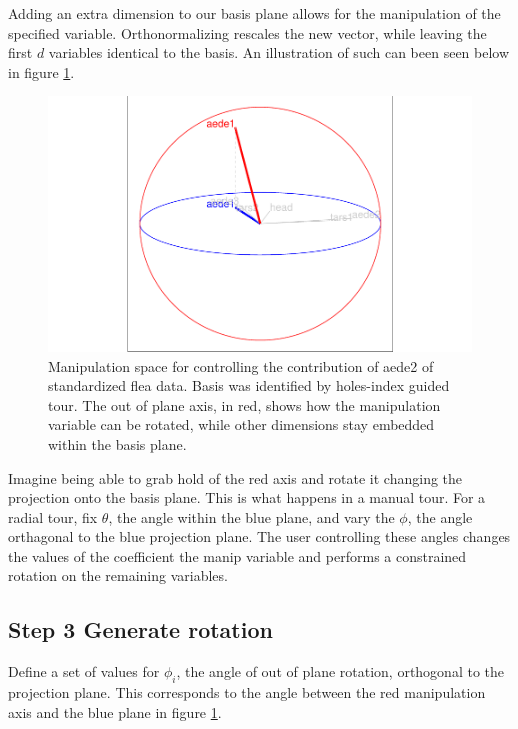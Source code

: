 \documentclass{monashthesis}
\begin{document}
Adding an extra dimension to our basis plane allows for the manipulation
of the specified variable. Orthonormalizing rescales the new vector,
while leaving the first \(d\) variables identical to the basis. An
illustration of such can been seen below in figure \ref{fig:step2}.

\begin{figure}

{\centering \includegraphics[width=1\linewidth]{thesis_files/figure-latex/step2-1} 

}

\caption{Manipulation space for controlling the contribution of aede2 of standardized flea data. Basis was identified by holes-index guided tour. The out of plane axis, in red, shows how the manipulation variable can be rotated, while other dimensions stay embedded within the basis plane.}\label{fig:step2}
\end{figure}

Imagine being able to grab hold of the red axis and rotate it changing
the projection onto the basis plane. This is what happens in a manual
tour. For a radial tour, fix \(\theta\), the angle within the blue
plane, and vary the \(\phi\), the angle orthagonal to the blue
projection plane. The user controlling these angles changes the values
of the coefficient the manip variable and performs a constrained
rotation on the remaining variables.

\subsection{Step 3 Generate rotation}\label{step-3-generate-rotation}

Define a set of values for \(\phi_i\), the angle of out of plane
rotation, orthogonal to the projection plane. This corresponds to the
angle between the red manipulation axis and the blue plane in figure
\ref{fig:step2}.
\end{document}
